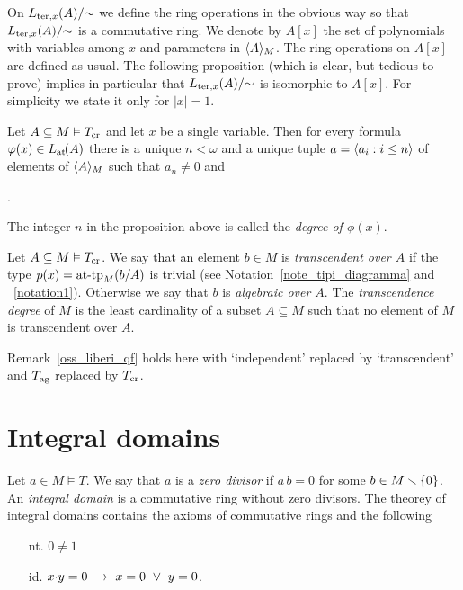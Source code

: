 \documentclass[creche.tex]{subfiles}
\begin{document}
On $L_{{\rm ter},x}(A)/\mathord{\sim}$ we define the ring operations in the obvious way so that $L_{{\rm ter},x}(A)/\mathord{\sim}$ is a commutative ring. We denote by $A[x]$ the set of polynomials with variables among $x$ and parameters in $\<A\>_M$. The ring operations on $A[x]$ are defined as usual. The following proposition (which is clear, but tedious to prove) implies in particular that $L_{{\rm ter},x}(A)/\mathord{\sim}$ is isomorphic to $A[x]$. For simplicity we state it only for $|x|=1$.

\begin{proposition}
\label{prop_formacanonicaterminiau}
Let  $A\subseteq M\models T_{\rm cr}$ and let $x$ be a single variable. Then for every formula $\phi(x)\in \atL(A)$ there is a unique $n<\omega$ and a unique tuple $a=\<a_i:i\le n\>$ of elements of $\<A\>_M$ such that $a_n\neq0$ and 

.\QED
\end{proposition}

The integer $n$ in the proposition above is called the \emph{degree of $\phi(x)$}.

\begin{definition} Let $A\subseteq M\models T_{\rm cr}$. We say that an element $b\in M$ is \emph{transcendent over $A$\/} if the type $p(x)=\attp_M(b/A)$ is trivial (see Notation~\ref{note_tipi_diagramma} and ~\ref{notation1}). Otherwise we say that $b$ is \emph{algebraic over $A$}. The \emph{transcendence degree\/} of $M$ is the least cardinality of a subset $A\subseteq M$ such that no element of $M$ is transcendent over $A$.\QED
\end{definition}  

\begin{remark}\label{oss_liberi_cr}
Remark~\ref{oss_liberi_qf} holds here with `independent' replaced by `transcendent' and $T_{\rm ag}$ replaced by $T_{\rm cr}$.\QED
\end{remark}

\section{Integral domains}

Let $a\in M\models T$. We say that $a$ is a \emph{zero divisor} if $a\,b=0$ for some $b\in M\sm\{0\}$. An \emph{integral domain\/} is a commutative ring without zero divisors. The theorey of integral domains contains the axioms of commutative rings and the following
\begin{itemize}
\item[nt.] $0\neq 1$
\item[id.] $x\mdot y =0\ \imp\ x=0\ \vee\ y=0$.
\end{itemize}
\end{document}
